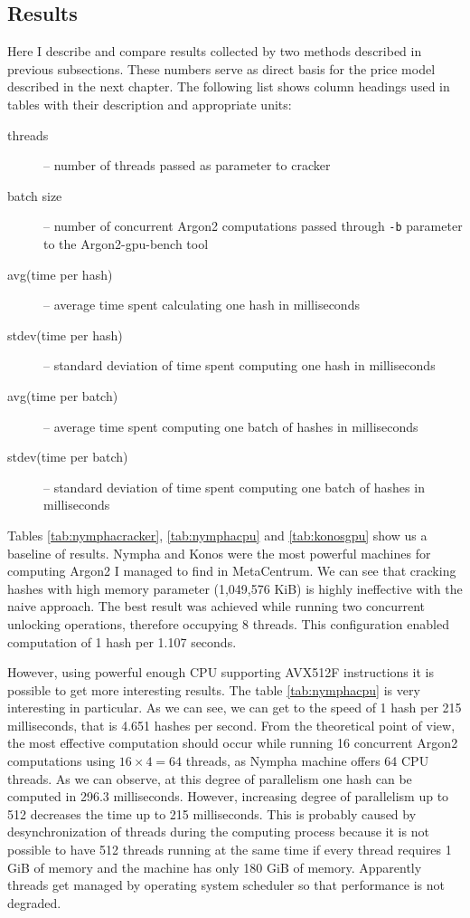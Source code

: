 \documentclass[nolof]{fithesis3}
\begin{document}
\FloatBarrier

\subsection{Results}
Here I describe and compare results collected by two methods described in previous subsections. These numbers serve as direct basis for the price model described in the next chapter. The following list shows column headings used in tables with their description and appropriate units:

\begin{description}
\item[threads] -- number of threads passed as parameter to cracker

\item[batch size] -- number of concurrent Argon2 computations passed through \verb+-b+ parameter to the Argon2-gpu-bench tool

\item[avg(time per hash)] -- average time spent calculating one hash in milliseconds

\item[stdev(time per hash)] -- standard deviation of time spent computing one hash in milliseconds

\item[avg(time per batch)] -- average time spent computing one batch of hashes in milliseconds

\item[stdev(time per batch)] -- standard deviation of time spent computing one batch of hashes in milliseconds
\end{description}

Tables \ref{tab:nymphacracker}, \ref{tab:nymphacpu}  and \ref{tab:konosgpu} show us a baseline of results. Nympha and Konos were the most powerful machines for computing Argon2 I managed to find in MetaCentrum. We can see that cracking hashes with high memory parameter (1,049,576 KiB) is highly ineffective with the naive approach. The best result was achieved while running two concurrent unlocking operations, therefore occupying 8 threads. This configuration enabled computation of 1 hash per 1.107 seconds.

However, using powerful enough CPU supporting AVX512F instructions it is possible to get more interesting results. The table \ref{tab:nymphacpu} is very interesting in particular. As we can see, we can get to the speed of 1 hash per 215 milliseconds, that is 4.651 hashes per second. From the theoretical point of view, the most effective computation should occur while running 16 concurrent Argon2 computations using $16 \times 4 = 64$ threads, as Nympha machine offers 64 CPU threads. As we can observe, at this degree of parallelism one hash can be computed in 296.3 milliseconds. However, increasing degree of parallelism up to 512 decreases the time up to 215 milliseconds. This is probably caused by desynchronization of threads during the computing process because it is not possible to have 512 threads running at the same time if every thread requires 1 GiB of memory and the machine has only 180 GiB of memory. Apparently threads get managed by operating system scheduler so that performance is not degraded.
\end{document}
